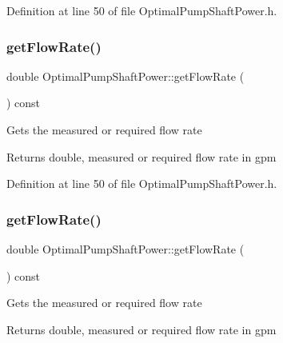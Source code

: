 Definition at line 50 of file Optimal\+Pump\+Shaft\+Power.\+h.

\mbox{\label{class_optimal_pump_shaft_power_a8c1532459a196347f7d5219d4690a490}} 
\subsubsection{\texorpdfstring{get\+Flow\+Rate()}{getFlowRate()}\hspace{0.1cm}{\footnotesize\ttfamily [2/3]}}
{\footnotesize\ttfamily double Optimal\+Pump\+Shaft\+Power\+::get\+Flow\+Rate (\begin{DoxyParamCaption}{ }\end{DoxyParamCaption}) const\hspace{0.3cm}{\ttfamily [inline]}}

Gets the measured or required flow rate

\begin{DoxyReturn}{Returns}
double, measured or required flow rate in gpm 
\end{DoxyReturn}


Definition at line 50 of file Optimal\+Pump\+Shaft\+Power.\+h.

\mbox{\label{class_optimal_pump_shaft_power_a8c1532459a196347f7d5219d4690a490}} 
\subsubsection{\texorpdfstring{get\+Flow\+Rate()}{getFlowRate()}\hspace{0.1cm}{\footnotesize\ttfamily [3/3]}}
{\footnotesize\ttfamily double Optimal\+Pump\+Shaft\+Power\+::get\+Flow\+Rate (\begin{DoxyParamCaption}{ }\end{DoxyParamCaption}) const\hspace{0.3cm}{\ttfamily [inline]}}

Gets the measured or required flow rate

\begin{DoxyReturn}{Returns}
double, measured or required flow rate in gpm 
\end{DoxyReturn}


